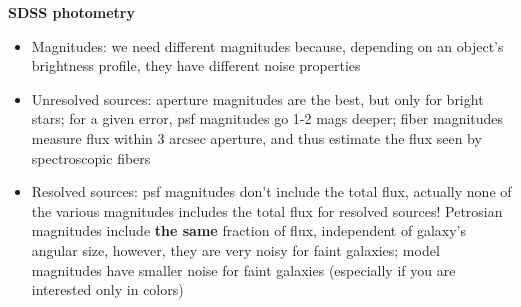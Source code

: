 \documentclass[letterpaper,landscape]{slides}
\begin{document}





\begin{slide}
\begin{center}
\bfseries
{\large {\color{red} SDSS photometry}}
\end{center}
\vskip 0.6in

\begin{itemize}
\item {\color{blue} Magnitudes:} we need different magnitudes because, depending
     on an object's brightness profile, they have different noise properties
 \item {\color{blue} Unresolved sources:} {\color{red} aperture magnitudes} are the best, but 
       only for bright stars; for a given error, {\color{red} psf magnitudes} go 1-2 mags deeper; 
      {\color{red} fiber magnitudes} measure flux within 3 arcsec aperture, and thus estimate 
       the flux seen by spectroscopic fibers
\item {\color{blue} Resolved sources:} psf magnitudes don't include the total 
      flux, actually none of the various magnitudes includes the total flux
      for resolved sources! {\color{red} Petrosian magnitudes} include {\bf the same} 
      fraction of flux, independent of galaxy's angular size, however, they are
      very noisy for faint galaxies; {\color{red} model magnitudes} have smaller noise for
      faint galaxies (especially if you are interested only in colors)
\end{itemize}

\end{slide}
 
\end{document}
